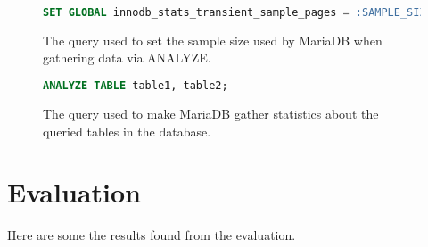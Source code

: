 \begin{figure}[ht]
\begin{lstlisting}[language=SQL]
  SET GLOBAL innodb_stats_transient_sample_pages = :SAMPLE_SIZE;
\end{lstlisting}
\caption[Setting the sample size in MariaDB.]{The query used to set the sample
  size used by MariaDB when gathering data via ANALYZE.}
\label{fig:sql:mdbsamplesize}
\end{figure}

\begin{figure}[ht]
\begin{lstlisting}[language=SQL]
  ANALYZE TABLE table1, table2;
\end{lstlisting}
\caption[Analyzing the tables in MariaDB.]{The query used to make MariaDB
  gather statistics about the queried tables in the database.}
\label{fig:sql:mdbanalyze}
\end{figure}

\section{Evaluation}
Here are some the results found from the evaluation.

